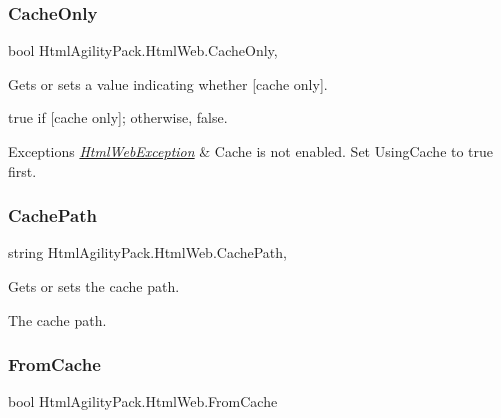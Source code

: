 \subsubsection{\texorpdfstring{Cache\+Only}{CacheOnly}}
{\footnotesize\ttfamily bool Html\+Agility\+Pack.\+Html\+Web.\+Cache\+Only\hspace{0.3cm}{\ttfamily [get]}, {\ttfamily [set]}}



Gets or sets a value indicating whether \mbox{[}cache only\mbox{]}. 

{\ttfamily true} if \mbox{[}cache only\mbox{]}; otherwise, {\ttfamily false}.


\begin{DoxyExceptions}{Exceptions}
{\em \hyperlink{class_html_agility_pack_1_1_html_web_exception}{Html\+Web\+Exception}} & Cache is not enabled. Set Using\+Cache to true first.\\
\hline
\end{DoxyExceptions}
\mbox{\label{class_html_agility_pack_1_1_html_web_a2f882037a15e91c45e69397b185df84e}} 
\subsubsection{\texorpdfstring{Cache\+Path}{CachePath}}
{\footnotesize\ttfamily string Html\+Agility\+Pack.\+Html\+Web.\+Cache\+Path\hspace{0.3cm}{\ttfamily [get]}, {\ttfamily [set]}}



Gets or sets the cache path. 

The cache path.\mbox{\label{class_html_agility_pack_1_1_html_web_a5a0858df3c5bb63411f9bfce81e93b20}} 
\subsubsection{\texorpdfstring{From\+Cache}{FromCache}}
{\footnotesize\ttfamily bool Html\+Agility\+Pack.\+Html\+Web.\+From\+Cache\hspace{0.3cm}{\ttfamily [get]}}



